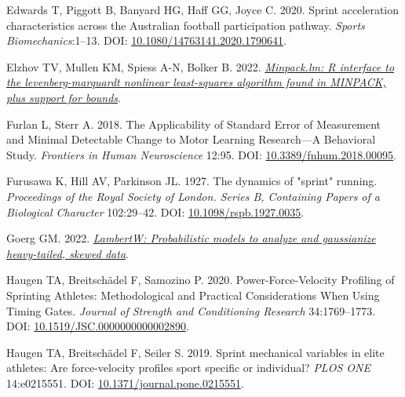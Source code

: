 \documentclass[fleqn,10pt]{wlpeerj} %
\newlength{\cslhangindent}
\newlength{\cslentryspacingunit} %
\newenvironment{CSLReferences}[2] %
 {%
  \setlength{\parindent}{0pt}
  \ifodd #1
  \let\oldpar\par
  \def\par{\hangindent=\cslhangindent\oldpar}
  \fi
  \setlength{\parskip}{#2\cslentryspacingunit}
 }%
 {}
\begin{document}
\begin{CSLReferences}{1}{0}
\leavevmode{}%
Edwards T, Piggott B, Banyard HG, Haff GG, Joyce C. 2020. Sprint acceleration characteristics across the {Australian} football participation pathway. \emph{Sports Biomechanics}:1--13. DOI: \href{https://doi.org/10.1080/14763141.2020.1790641}{10.1080/14763141.2020.1790641}.

\leavevmode{}%
Elzhov TV, Mullen KM, Spiess A-N, Bolker B. 2022. \emph{\href{https://CRAN.R-project.org/package=minpack.lm}{Minpack.lm: R interface to the levenberg-marquardt nonlinear least-squares algorithm found in MINPACK, plus support for bounds}}.

\leavevmode{}%
Furlan L, Sterr A. 2018. The {Applicability} of {Standard Error} of {Measurement} and {Minimal Detectable Change} to {Motor Learning Research}---{A Behavioral Study}. \emph{Frontiers in Human Neuroscience} 12:95. DOI: \href{https://doi.org/10.3389/fnhum.2018.00095}{10.3389/fnhum.2018.00095}.

\leavevmode{}%
Furusawa K, Hill AV, Parkinson JL. 1927. The dynamics of "sprint" running. \emph{Proceedings of the Royal Society of London. Series B, Containing Papers of a Biological Character} 102:29--42. DOI: \href{https://doi.org/10.1098/rspb.1927.0035}{10.1098/rspb.1927.0035}.

\leavevmode{}%
Goerg GM. 2022. \emph{\href{https://CRAN.R-project.org/package=LambertW}{LambertW: Probabilistic models to analyze and gaussianize heavy-tailed, skewed data}}.

\leavevmode{}%
Haugen TA, Breitschädel F, Samozino P. 2020. Power-{Force}-{Velocity Profiling} of {Sprinting Athletes}: {Methodological} and {Practical Considerations When Using Timing Gates}. \emph{Journal of Strength and Conditioning Research} 34:1769--1773. DOI: \href{https://doi.org/10.1519/JSC.0000000000002890}{10.1519/JSC.0000000000002890}.

\leavevmode{}%
Haugen TA, Breitschädel F, Seiler S. 2019. Sprint mechanical variables in elite athletes: {Are} force-velocity profiles sport specific or individual? \emph{PLOS ONE} 14:e0215551. DOI: \href{https://doi.org/10.1371/journal.pone.0215551}{10.1371/journal.pone.0215551}.


\end{CSLReferences}
\end{document}
